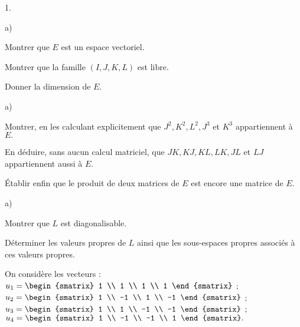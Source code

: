 \documentclass[11pt]{article}%
\begin{document}
\begin{noliste}{1.}
 \setlength{\itemsep}{4mm}
\item 

\begin{noliste}{a)}
 \setlength{\itemsep}{2mm}
\item Montrer que $E$ est un espace vectoriel.

\item Montrer que la famille $(I,J,K,L)$ est libre.

\item Donner la dimension de $E.$
\end{noliste}

\item 

\begin{noliste}{a)}
 \setlength{\itemsep}{2mm}
\item Montrer, en les calculant explicitement que
$J^{2},K^{2},L^{2},J^{3}$
et $K^{3}$ appartiennent à $E.$

\item En déduire, sans aucun calcul matriciel, que $JK,KJ,KL,LK,JL$ et
$LJ$
appartiennent aussi à $E.$

\item Établir enfin que le produit de deux matrices de $E$ est encore
une
matrice de $E.$
\end{noliste}

\item 

\begin{noliste}{a)}
 \setlength{\itemsep}{2mm}
\item Montrer que $L$ est diagonalisable.

\item Déterminer les valeurs propres de $L$ ainsi que les sous-espaces
propres associés à ces valeurs propres.
\end{noliste}

\item On considère les vecteurs : $u_{1} = 
\begin{smatrix}
1 \\
1 \\
1 \\
1
\end{smatrix}
$ $;$ $u_{2} = 
\begin{smatrix}
1 \\
-1 \\
1 \\
-1
\end{smatrix}
$ $;$ $u_{3} = 
\begin{smatrix}
1 \\
1 \\
-1 \\
-1
\end{smatrix}
$ $;$ $u_{4} = 
\begin{smatrix}
1 \\
-1 \\
-1 \\
1
\end{smatrix}.$


\end{noliste}
\end{document}
